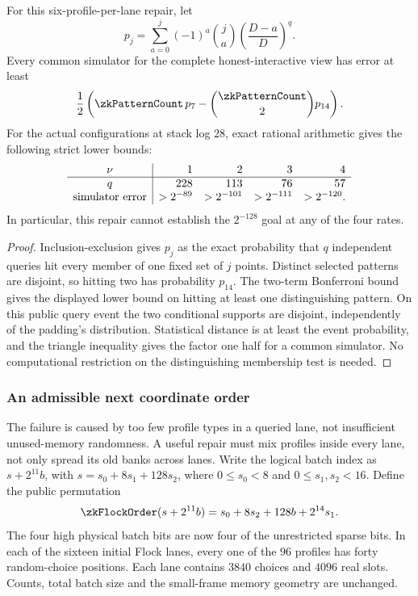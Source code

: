 \begin{theorem}\label{thm:zk-flock-coset-floor}
For this six-profile-per-lane repair, let
\[
 p_j=\sum_{a=0}^j(-1)^a\binom ja\left(\frac{D-a}{D}\right)^q.
\]
Every common simulator for the complete honest-interactive view has error at least
\[
 \frac12\left(\zkPatternCount\,p_7-\binom{\zkPatternCount}{2}p_{14}\right).
\]
For the actual configurations at stack log $28$, exact rational arithmetic gives the following strict lower bounds:
\[
\begin{array}{c|rrrr}
 \nu&1&2&3&4\\\hline
 q&228&113&76&57\\
 \text{simulator error}&>2^{-89}&>2^{-101}&>2^{-111}&>2^{-120}.
\end{array}
\]
In particular, this repair cannot establish the $2^{-128}$ goal at any of the four rates.
\end{theorem}
\begin{proof}
Inclusion-exclusion gives $p_j$ as the exact probability that $q$ independent queries hit every member of one fixed set of $j$ points. Distinct selected patterns are disjoint, so hitting two has probability $p_{14}$. The two-term Bonferroni bound gives the displayed lower bound on hitting at least one distinguishing pattern. On this public query event the two conditional supports are disjoint, independently of the padding's distribution. Statistical distance is at least the event probability, and the triangle inequality gives the factor one half for a common simulator. No computational restriction on the distinguishing membership test is needed.
\end{proof}

\subsubsection{An admissible next coordinate order}

The failure is caused by too few profile types in a queried lane, not insufficient unused-memory randomness. A useful repair must mix profiles inside every lane, not only spread its old banks across lanes. Write the logical batch index as $s+2^{11}b$, with $s=s_0+8s_1+128s_2$, where $0\le s_0<8$ and $0\le s_1,s_2<16$. Define the public permutation
\[
 \zkFlockOrder(s+2^{11}b)=s_0+8s_2+128b+2^{14}s_1.
\]
The four high physical batch bits are now four of the unrestricted sparse bits. In each of the sixteen initial Flock lanes, every one of the $96$ profiles has forty random-choice positions. Each lane contains $3840$ choices and $4096$ real slots. Counts, total batch size and the small-frame memory geometry are unchanged.

